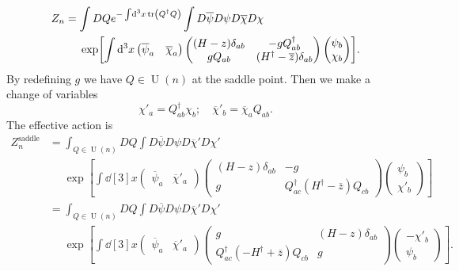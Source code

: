 \documentclass{article}
\begin{document}
\begin{align*}
    Z_n &= \int DQ e^{-\int \dd[3]{x} \tr(Q^\dagger Q)} \int D{\overline{\psi}}D{{\psi}}D{\overline{\chi}}D{{\chi}} \\
    &\phantom{{}={}} \exp[\int \dd[3]{x} \begin{pmatrix}
        \overline{\psi}_a & \overline{\chi}_a
    \end{pmatrix} \begin{pmatrix}
        (H - z)\delta_{ab} & -g Q^\dagger_{ab} \\
        g Q_{ab} & (H^\dagger - \overline{z})\delta_{ab}
    \end{pmatrix} \begin{pmatrix}
        \psi_b \\ \chi_b
    \end{pmatrix}].
\end{align*}
By redefining $g$ we have $Q\in \operatorname{U}(n)$ at the saddle point.
Then we make a change of variables
\[ \chi'_a = Q^\dagger_{ab} \chi_b;\quad \overline{\chi}'_b = \overline{\chi}_a Q_{ab}. \]
The effective action is
\begin{align*}
    Z_n^{\text{saddle}} &= \int_{Q\in \operatorname{U}(n)} DQ \int D{\overline{\psi}}D{{\psi}}D{\overline{\chi}'}D{{\chi}'} \\
    &\phantom{{}={}} \exp[\int \dd[3]{x} \begin{pmatrix}
        \overline{\psi}_a & \overline{\chi}'_a
    \end{pmatrix} \begin{pmatrix}
        (H - z)\delta_{ab} & -g \\
        g & Q^\dagger_{ac}(H^\dagger - \overline{z})Q_{cb}
    \end{pmatrix} \begin{pmatrix}
        \psi_b \\ \chi'_b
    \end{pmatrix}] \\
    &= \int_{Q\in \operatorname{U}(n)} DQ \int D{\overline{\psi}}D{{\psi}}D{\overline{\chi}'}D{{\chi}'} \\
    &\phantom{{}={}} \exp[\int \dd[3]{x} \begin{pmatrix}
        \overline{\psi}_a & \overline{\chi}'_a
    \end{pmatrix} \begin{pmatrix}
        g & (H - z)\delta_{ab} \\
        Q^\dagger_{ac}(- H^\dagger + \overline{z})Q_{cb} & g
    \end{pmatrix} \begin{pmatrix}
        -\chi'_b \\ \psi_b 
    \end{pmatrix}].
\end{align*}
\end{document}
